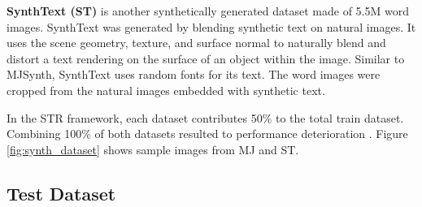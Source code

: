 \documentclass[runningheads]{llncs}
\begin{document}
\textbf{SynthText (ST)} is another synthetically generated dataset made of 5.5M word images. SynthText was generated by blending synthetic text on natural images. It uses the scene geometry, texture, and surface normal to naturally blend and distort a text rendering on the surface of an object within the image. Similar to MJSynth, SynthText uses random fonts for its text. The word images were cropped from the natural images embedded with synthetic text.

In the STR framework, each dataset contributes 50\% to the total train dataset. Combining 100\% of both datasets resulted to performance deterioration \cite{baek2019wrong}. Figure \ref{fig:synth_dataset} shows sample images from MJ and ST.

\subsection{Test Dataset}
\end{document}
